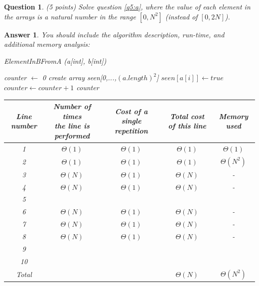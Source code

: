 \documentclass[a4paper]{article}
\theoremstyle{remarksStyle}
\theoremstyle{questionStyle}
\newtheorem{question}{Question}
\theoremstyle{answerStyle}
\newtheorem{answer}{Answer}
\begin{document}
\vspace{0.75 cm}

\begin{question} \label{q6} (5 points)
Solve question \ref{q5:a}, where the value of each element in the arrays is a natural number in the range $[0,N^2]$ (instead of $[0, 2N]$).
\end{question}

\vspace{0.5 cm}

\begin{answer}
    You should include the algorithm description, run-time, and additional memory analysis:

\begin{algorithm}[H]
  \caption{ElementInBFromA (a[int], b[int])}
  \begin{algorithmic}[1]
    \STATE counter $\gets$ 0
    \STATE  create array seen[0,...,$(a.length)^2$]
          \STATE $seen[a[i]] \gets true$
      \ENDFOR  
          \STATE $counter \gets counter + 1$
          \ENDIF
      \ENDFOR  
    \RETURN counter
  \end{algorithmic} 
\end{algorithm}

\begin{center}    
\begin{tabular}{||c | c | c | c | c ||} 
 \hline
 Line number & \makecell{Number of times \\ the line is performed} & Cost of a single repetition & Total cost of this line & Memory used\\ [0.5ex] 
 \hline\hline
 1 & $\Theta(1)$ & $\Theta(1)$ & $\Theta (1)$ & $\Theta (1)$  \\ 
 \hline
 2 & $\Theta(1)$& $\Theta(1)$& $\Theta(1)$ & $\Theta(N^2)$ \\
 \hline
 3 & $\Theta(N)$ &$\Theta(1)$ & $\Theta(N)$ & -\\ 
  \hline
 4 &$\Theta(N)$ &$\Theta(1)$ &$\Theta(N)$ & - \\ 
   \hline
 5 & \cellcolor{Gray} & \cellcolor{Gray} & \cellcolor{Gray} & \cellcolor{Gray}\\  
  \hline
 6 &$\Theta(N)$ &$\Theta(1)$ &$\Theta(N)$ & - \\ 
    \hline
 7 &$\Theta(N)$ &$\Theta(1)$ &$\Theta(N)$ & - \\ 
 \hline
 8 &$\Theta(N)$ &$\Theta(1)$ &$\Theta(N)$ & - \\ 
 \hline
 9 & \cellcolor{Gray} & \cellcolor{Gray} & \cellcolor{Gray} & \cellcolor{Gray}\\  
10 & \cellcolor{Gray} & \cellcolor{Gray} & \cellcolor{Gray} & \cellcolor{Gray}\\  
 Total & \cellcolor{Gray} & \cellcolor{Gray} & $\Theta (N)$ &$\Theta(N^2)$  \\ 
 \hline
\end{tabular}
\end{center}
\end{answer}
\end{document}
